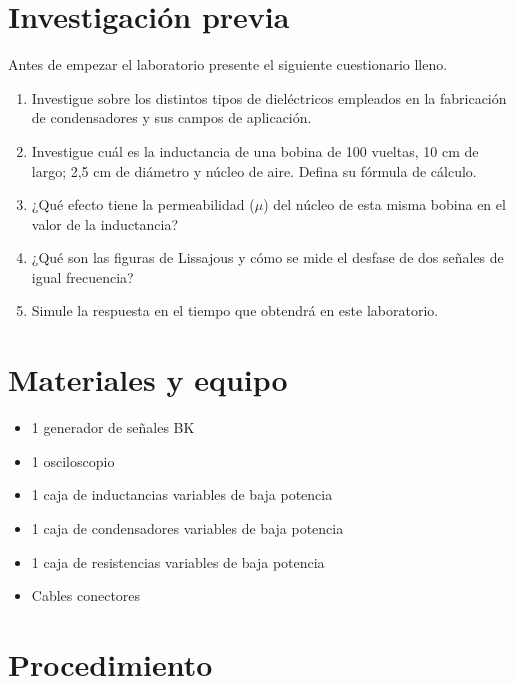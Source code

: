 \documentclass[12pt,letterpaper]{report}
\newcommand{\inv}{Investigación previa}
\newcommand{\mat}{Materiales y equipo}
\newcommand{\pro}{Procedimiento}
\newcommand{\antesde}{Antes de empezar el laboratorio presente el siguiente cuestionario lleno.}
\begin{document}
\section{\inv}
\antesde
\begin{enumerate}
\item Investigue sobre los distintos tipos de dieléctricos empleados en la
fabricación de condensadores y sus campos de aplicación.
\item Investigue cuál es la inductancia de una bobina de 100 vueltas, 10 cm de
largo; 2,5 cm de diámetro y núcleo de aire. Defina su fórmula de cálculo.
\item ¿Qué efecto tiene la permeabilidad ($\mu$) del núcleo de esta misma bobina en
el valor de la inductancia?
\item ¿Qué son las figuras de Lissajous y cómo se mide el desfase de dos señales
de igual frecuencia?
\item Simule la respuesta en el tiempo que obtendrá en este laboratorio.
\end{enumerate}

\section{\mat}
\begin{itemize}
\item 1 generador de señales BK
\item 1 osciloscopio
\item 1 caja de inductancias variables de baja potencia
\item 1 caja de condensadores variables de baja potencia
\item 1 caja de resistencias variables de baja potencia
\item Cables conectores
\end{itemize}

\section{\pro}
\end{document}
